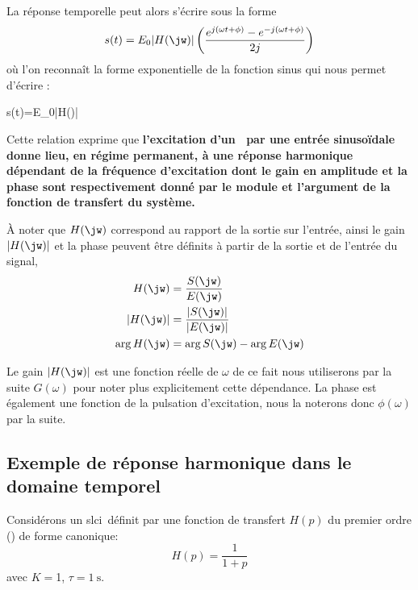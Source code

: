 La réponse temporelle peut alors s'écrire sous la forme 
\begin{align*}
    s(t)=E_0|H(\jw)|\left(\dfrac{e^{j(\omega t+\phi)}-e^{-j(\omega t+\phi)}}{2j}\right)
\end{align*}
où l'on reconnaît la forme exponentielle de la fonction sinus qui nous permet d'écrire :
\begin{bequation}
    s(t)=E_0|H(\jw)|\label{eq-rh}
\end{bequation}

Cette relation exprime que \textbf{l'excitation d'un {}~par une entrée sinuso\"idale donne 
lieu, en régime permanent, à une réponse harmonique dépendant de la fréquence d'excitation dont 
le gain en amplitude et la phase sont respectivement donné par le module et l'argument de la fonction
de transfert du système.}

\`A noter que $H(\jw)$ correspond au rapport de la sortie sur l'entrée,
ainsi le gain $|H(\jw)|$ et la phase peuvent être définits à partir de la sortie et de l'entrée du signal,
\begin{align*}
    H(\jw) &= \dfrac{S(\jw)}{E(\jw)} \\
    |H(\jw)|&= \dfrac{|S(\jw)|}{|E(\jw)|} \\
    \arg{H(\jw)}&=\arg{S(\jw)}-\arg{E(\jw)}
\end{align*}

Le gain $|H(\jw)|$ est une fonction réelle de $\omega$ de ce fait nous utiliserons par la suite
$G(\omega)$ pour noter plus explicitement cette dépendance. La phase est également
une fonction de la pulsation d'excitation, nous la noterons donc $\phi(\omega)$ par la suite.


\subsection{Exemple de réponse harmonique dans le domaine temporel}

Considérons un \gls{slci}~définit par une fonction de transfert $H(p)$ du premier ordre () de forme canonique:
$$
H(p)=\dfrac{1}{1+p}
$$
avec $K=$1, $\tau=\SI{1}{\second}$.

